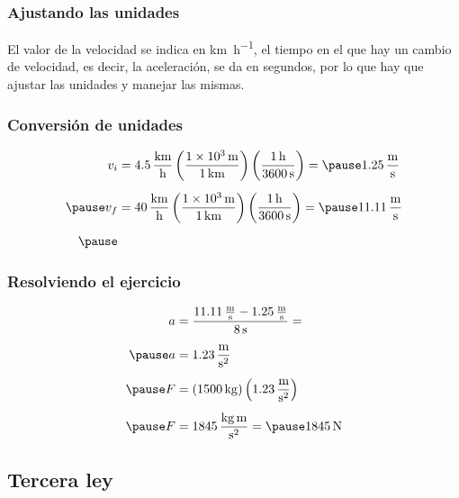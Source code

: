 \documentclass[14pt]{beamer}
\begin{document}
\begin{frame}
\frametitle{Ajustando las unidades}
El valor de la velocidad se indica en \unit{\kilo\meter\per\hour}, el tiempo en el que hay un cambio de velocidad, es decir, la aceleración, se da en segundos, por lo que hay que ajustar las unidades y manejar las mismas.
\end{frame}
\begin{frame}
\frametitle{Conversión de unidades}
\begin{eqnarray*}
\begin{aligned}
v_{i} &= \SI[per-mode=fraction]{4.5}{\kilo\meter\per\hour} \left( \dfrac{\SI{1d3}{\meter}}{\SI{1}{\kilo\meter}} \right) \left( \dfrac{\SI{1}{\hour}}{\SI{3600}{\second}} \right) = \pause \SI[per-mode=fraction]{1.25}{\meter\per\second} \\[0.5em] \pause
v_{f} &= \SI[per-mode=fraction]{40}{\kilo\meter\per\hour} \left( \dfrac{\SI{1d3}{\meter}}{\SI{1}{\kilo\meter}} \right) \left( \dfrac{\SI{1}{\hour}}{\SI{3600}{\second}} \right) = \pause \SI[per-mode=fraction]{11.11}{\meter\per\second} \\[0.5em] \pause
\end{aligned}
\end{eqnarray*}
\end{frame}
\begin{frame}
\frametitle{Resolviendo el ejercicio}
\pause
\begin{eqnarray*}
\begin{aligned}
a &= \dfrac{\SI[per-mode=fraction]{11.11}{\meter\per\second} - \SI[per-mode=fraction]{1.25}{\meter\per\second}}{\SI{8}{\second}} = \\[0.5em] \pause
a &= \SI[per-mode=fraction]{1.23}{\meter\per\square\second} \\[0.5em] \pause
F &= \left( \SI{1500}{\kilo\gram} \right) \left( \SI[per-mode=fraction]{1.23}{\meter\per\square\second} \right) \\[0.5em] \pause
F &= \SI[per-mode=fraction]{1845}{\kilo\gram\meter\per\square\second} = \pause \SI{1845}{\newton}
\end{aligned}
\end{eqnarray*}  
\end{frame}

\subsection{Tercera ley}
\end{document}
